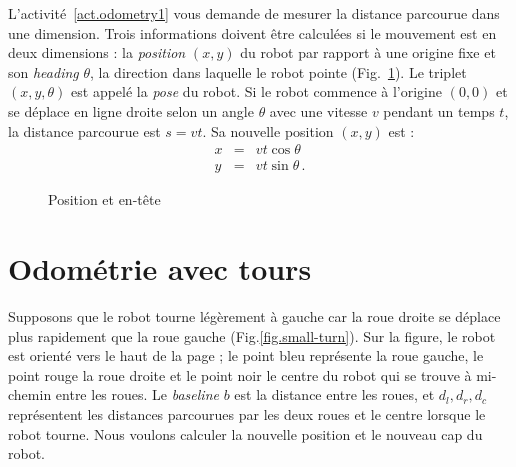 {L'activité~\ref{act.odometry1} vous demande de mesurer la distance parcourue dans une dimension. Trois informations doivent être calculées si le mouvement est en deux dimensions : la \emph{position} $(x,y)$ du robot par rapport à une origine fixe et son \emph{heading} $\theta$, la direction dans laquelle le robot pointe (Fig.~\ref{fig.pos-head}). Le triplet $(x,y,\theta)$ est appelé la \emph{pose} du robot. Si le robot commence à l'origine $(0,0)$ et se déplace en ligne droite selon un angle $\theta$ avec une vitesse $v$ pendant un temps $t$, la distance parcourue est $s=vt$. Sa nouvelle position $(x,y)$ est :
\begin{eqnarray*}
x &=& vt \cos \theta\\
y &=& vt \sin \theta\,.
\end{eqnarray*}

\begin{figure}
\begin{center}
\caption{Position et en-tête}\label{fig.pos-head}
\end{center}
\end{figure}


\section{Odométrie avec tours}\label{s.odometry-turns}

Supposons que le robot tourne légèrement à gauche car la roue droite se déplace plus rapidement que la roue gauche (Fig.\ref{fig.small-turn}). Sur la figure, le robot est orienté vers le haut de la page ; le point bleu représente la roue gauche, le point rouge la roue droite et le point noir le centre du robot qui se trouve à mi-chemin entre les roues. Le \textit{baseline} $b$ est la distance entre les roues, et $d_l, d_r, d_c$ représentent les distances parcourues par les deux roues et le centre lorsque le robot tourne. Nous voulons calculer la nouvelle position et le nouveau cap du robot.

}
